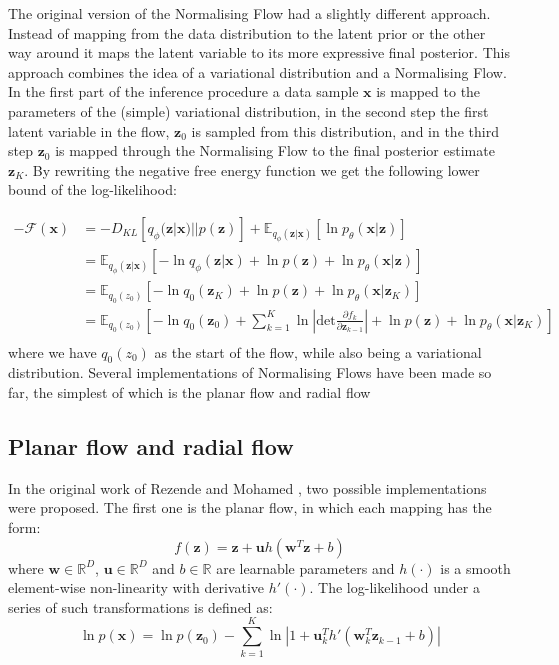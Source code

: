 \documentclass{report}
\newcommand{\E}{\mathbb{E}}
\newcommand{\bu}{\mathbf{u}}
\newcommand{\bw}{\mathbf{w}}
\newcommand{\bx}{\mathbf{x}}
\newcommand{\bz}{\mathbf{z}}
\newcommand{\parfrac}[2]{\frac{\partial #1}{\partial#2}}
\begin{document}
The original version of the Normalising Flow had a slightly different approach. Instead of mapping from the data distribution to the latent prior or the other way around it maps the latent variable to its more expressive final posterior. This approach combines the idea of a variational distribution and a Normalising Flow. In the first part of the inference procedure a data sample $\bx$ is mapped to the parameters of the (simple) variational distribution, in the second step the first latent variable in the flow, $\bz_0$ is sampled from this distribution, and in the third step $\bz_0$ is mapped through the Normalising Flow to the final posterior estimate $\bz_K$. By rewriting the negative free energy function we get the following lower bound of the log-likelihood:

\begin{equation}\label{equation:negative_free_energy_with_flow}
    \begin{split}
    -\mathcal{F}(\bx) &= -D_{KL}[q_\phi(\bz|\bx) || p(\bz)] + \E_{q_\phi(\bz|\bx)}[\ln p_\theta(\bx|\bz)]\\
    &= \E_{q_\phi(\bz|\bx)}[-\ln q_\phi(\bz|\bx) + \ln p(\bz) + \ln p_\theta(\bx|\bz)]\\
    &= \E_{q_0(z_0)}[-\ln q_0(\bz_K) + \ln p(\bz) + \ln p_\theta(\bx|\bz_K)]\\
    &= \E_{q_0(z_0)}[-\ln q_0(\bz_0) + \sum\limits^K_{k=1}\ln \left|\text{det} \parfrac{f_k}{\bz_{k-1}} \right| + \ln p(\bz) + \ln p_\theta(\bx|\bz_K)]\\
    \end{split}
\end{equation}
where we have $q_0(z_0)$ as the start of the flow, while also being a variational distribution. Several implementations of Normalising Flows have been made so far, the simplest of which is the planar flow and radial flow

\subsection{Planar flow and radial flow}\label{section:planar_radial_flow}
In the original work of Rezende and Mohamed \cite{rezende2016variational}, two possible implementations were proposed. The first one is the planar flow, in which each mapping has the form:
\begin{equation}\label{equation:planar_flow}
    f(\bz) = \bz + \bu h(\bw^T\bz + b)
\end{equation}
where $\bw \in \mathbb{R}^D$, $\bu \in \mathbb{R}^D$ and $b \in \mathbb{R}$ are learnable parameters and $h(\cdot)$ is a smooth element-wise non-linearity with derivative $h'(\cdot)$. The log-likelihood under a series of such transformations is defined as:
\begin{equation}\label{equation:planar_flow_logdet}
    \ln p(\bx) = \ln p(\bz_0) - \sum\limits^K_{k=1} \ln \left|1 + \bu_k^T h'(\bw_k^T \bz_{k-1} + b) \right|
\end{equation}
\end{document}
